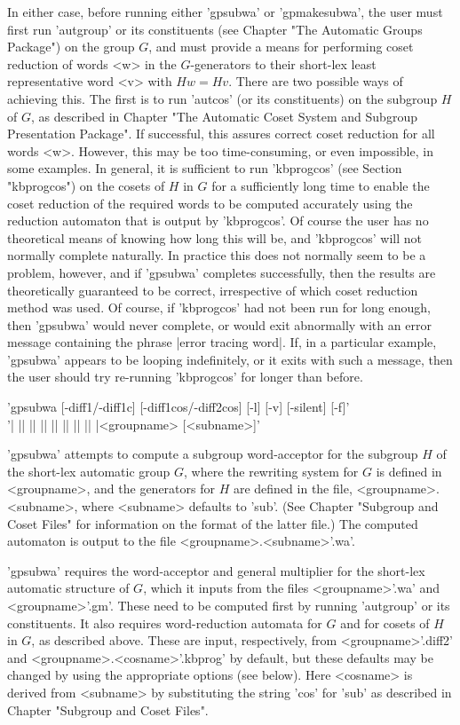 In either case, before running either 'gpsubwa' or 'gpmakesubwa',
the user must first run 'autgroup' or its constituents
(see Chapter "The Automatic Groups Package") on the group $G$, and must
provide a means for performing coset reduction of words <w> in the
$G$-generators to their short-lex least representative word <v> with
$Hw = Hv$. There are two possible ways of achieving this. The first is
to run 'autcos' (or its constituents) on the subgroup $H$ of $G$, as
described in Chapter
"The Automatic Coset System and Subgroup Presentation Package".
If successful, this assures correct coset reduction for all words <w>.
However, this may be too time-consuming, or even impossible, in
some examples. In general, it is sufficient to run 'kbprogcos' (see
Section "kbprogcos") on the cosets of $H$ in $G$ for a sufficiently
long time to enable the coset reduction of the required words to
be computed accurately using the reduction automaton that is output
by 'kbprogcos'. Of course the user has no theoretical means of
knowing how long this will be, and 'kbprogcos' will not normally
complete naturally. In practice this does not normally seem to be a problem,
however, and if 'gpsubwa' completes successfully, then the results are
theoretically guaranteed to be correct, irrespective of which
coset reduction method was used. Of course, if 'kbprogcos' had not
been run for long enough, then 'gpsubwa' would never complete, or would exit
abnormally with an error message containing the phrase
|error tracing word|.  If, in a particular example, 'gpsubwa' appears to be
looping indefinitely, or it exits with such a message, then the user should try
re-running 'kbprogcos' for longer than before.



'gpsubwa [-diff1/-diff1c] [-diff1cos/-diff2cos] [-l] [-v] [-silent] [-f]'\\
'| || || || || || || || |<groupname> [<subname>]'

'gpsubwa' attempts to compute a subgroup word-acceptor for the subgroup $H$ of
the short-lex automatic group $G$, where the rewriting system for $G$ is
defined in <groupname>, and the generators for $H$ are defined in the file,
<groupname>.<subname>, where <subname> defaults to 'sub'.
(See Chapter "Subgroup and Coset Files" for information on the format of
the latter file.) The computed automaton is output to the file
<groupname>.<subname>'.wa'.

'gpsubwa' requires the word-acceptor and general multiplier for the short-lex
automatic structure of $G$, which it inputs from the files <groupname>'.wa'
and <groupname>'.gm'.  These need to be computed
first by running 'autgroup' or its constituents. It also requires
word-reduction automata for $G$ and for cosets of $H$ in $G$, as described
above. These are input, respectively,  from <groupname>'.diff2' and
<groupname>.<cosname>'.kbprog' by default, but these defaults may be changed
by using the appropriate options (see below). Here <cosname> is derived
from <subname> by substituting the string 'cos' for 'sub' as described in
Chapter "Subgroup and Coset Files".

